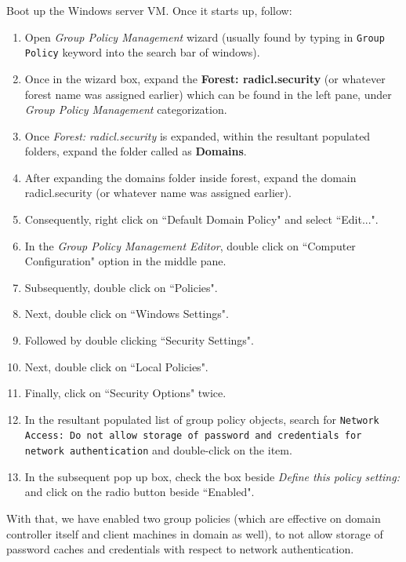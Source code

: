 \documentclass[12pt]{extarticle}
\begin{document}
\begin{enumerate}
	\noindent
	Boot up the Windows server VM. Once it starts up, follow:
		
	\begin{enumerate}
		\item Open \textit{Group Policy Management} wizard (usually found by typing in \texttt{Group Policy} keyword into the search bar of windows).
		\item Once in the wizard box, expand the \textbf{Forest: radicl.security} (or whatever forest name was assigned earlier) which can be found in the left pane, under \textit{Group Policy Management} categorization.
		\item Once \textit{Forest: radicl.security} is expanded, within the resultant populated folders, expand the folder called as \textbf{Domains}.
		\item After expanding the domains folder inside forest, expand the domain radicl.security (or whatever name was assigned earlier).
		\item Consequently, right click on ``Default Domain Policy" and select ``Edit...".
		\item In the \textit{Group Policy Management Editor}, double click on ``Computer Configuration" option in the middle pane.
		\item Subsequently, double click on ``Policies".
		\item Next, double click on ``Windows Settings".
		\item Followed by double clicking ``Security Settings".
		\item Next, double click on ``Local Policies".
		\item Finally, click on ``Security Options" twice.
		\item In the resultant populated list of group policy objects, search for \texttt{Network Access: Do not allow storage of password and credentials for network authentication} and double-click on the item.
		\item In the subsequent pop up box, check the box beside \textit{Define this policy setting:} and click on the radio button beside ``Enabled". 
	\end{enumerate} 
	
	With that, we have enabled two group policies (which are effective on domain controller itself and client machines in domain as well), to not allow storage of password caches and credentials with respect to network authentication.
	
\end{enumerate}
\end{document}
